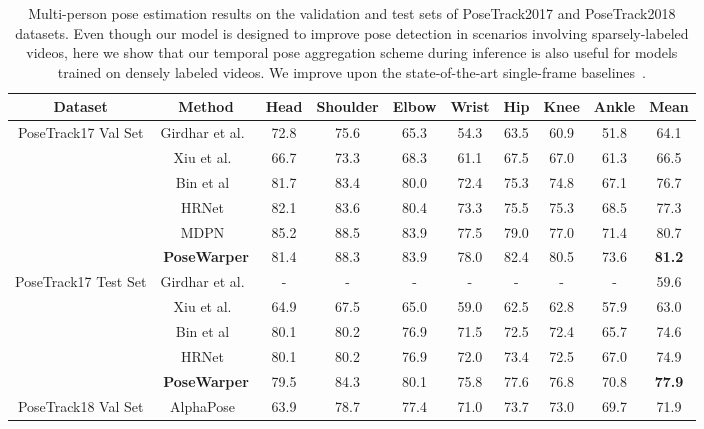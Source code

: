 \documentclass{article}
\begin{document}
\begin{table}[t]
\vspace{-0.1cm}
\caption{Multi-person pose estimation results on the validation and test sets of PoseTrack2017 and PoseTrack2018 datasets. Even though our model is designed to improve pose detection in scenarios involving sparsely-labeled videos, here we show that our temporal pose aggregation scheme during inference is also useful for models trained on densely labeled videos. We improve upon the state-of-the-art single-frame baselines~\cite{xiao2018simple,sun2019deep,DBLP:conf/eccv/GuoTLCLW18}.}\label{sota_table}
\setlength{\tabcolsep}{2.0pt}
\footnotesize
\begin{center}
 \begin{tabular}{c c c  c  c  c  c  c  c | c } 
 \hline
 Dataset & Method & Head & Shoulder & Elbow &  Wrist & Hip &  Knee & Ankle & Mean\\
 \hline \multirow{6}{*}{PoseTrack17 Val Set} & Girdhar et al.~\cite{girdhar2018detecttrack} & 72.8 & 75.6 & 65.3 & 54.3 & 63.5 & 60.9 & 51.8 &  64.1\\
  & Xiu et al.~\cite{xiu2018poseflow} & 66.7 & 73.3 & 68.3 & 61.1 & 67.5 & 67.0 & 61.3 & 66.5\\
  & Bin et al~\cite{xiao2018simple} & 81.7 & 83.4 & 80.0 & 72.4 & 75.3 & 74.8 & 67.1 & 76.7\\
  & HRNet~\cite{sun2019deep} & 82.1 & 83.6 & 80.4 & 73.3 & 75.5 & 75.3 & 68.5 & 77.3\\ 
  & MDPN~\cite{DBLP:conf/eccv/GuoTLCLW18} & 85.2 & 88.5 & 83.9 & 77.5 & 79.0 & 77.0 & 71.4 & 80.7\\
& \bf PoseWarper & 81.4 & 88.3 & 83.9 & 78.0 &  82.4 & 80.5 & 73.6 & \bf 81.2\\
 \hline
  \multirow{5}{*}{PoseTrack17 Test Set} & Girdhar et al.~\cite{girdhar2018detecttrack} & - & - & - & - & - & - & - &  59.6\\
  & Xiu et al.~\cite{xiu2018poseflow} & 64.9 & 67.5 & 65.0 & 59.0 & 62.5 & 62.8 & 57.9 & 63.0\\
  & Bin et al~\cite{xiao2018simple} & 80.1 & 80.2 & 76.9 & 71.5 & 72.5 & 72.4 & 65.7 & 74.6\\
  & HRNet~\cite{sun2019deep} & 80.1 & 80.2 & 76.9 & 72.0 & 73.4 & 72.5 & 67.0 & 74.9 \\ 
& \bf PoseWarper & 79.5 & 84.3 & 80.1 & 75.8 & 77.6 & 76.8 & 70.8 & \bf 77.9\\
   \hline
  \multirow{3}{*}{PoseTrack18 Val Set} & AlphaPose~\cite{Fang_2017_ICCV} & 63.9 & 78.7 & 77.4 & 71.0 & 73.7 & 73.0 & 69.7 & 71.9\\

\end{tabular}
\end{center}
\end{table}
\end{document}
